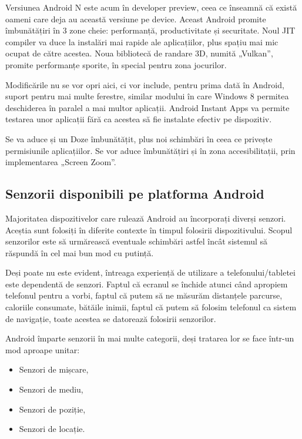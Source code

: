 \documentclass[12pt,a4paper]{article}
\begin{document}
	Versiunea Android N este acum în developer preview, ceea ce înseamnă că există oameni care deja au această versiune pe device. Aceast Android promite îmbunătățiri în 3 zone cheie: performanță, productivitate și securitate. Noul JIT compiler va duce la instalări mai rapide ale aplicațiilor, plus spațiu mai mic ocupat de către acestea. Noua bibliotecă de randare 3D, numită „Vulkan”, promite performanțe sporite, în special pentru zona jocurilor. 
	
	Modificările nu se vor opri aici, ci vor include, pentru prima dată în Android, suport pentru mai multe ferestre, similar modului în care Windows 8 permitea deschiderea în paralel a mai multor aplicații. Android Instant Apps va permite testarea unor aplicații fără ca acestea să fie instalate efectiv pe dispozitiv.	
	
	Se va aduce și un Doze îmbunătățit, plus noi schimbări în ceea ce privește permisiunile aplicațiilor. Se vor aduce îmbunătățiri și în zona accesibilitații, prin implementarea „Screen Zoom”.
	
	

\subsection{Senzorii disponibili pe platforma Android}
Majoritatea dispozitivelor care rulează Android au încorporați diverși senzori. Aceștia sunt folosiți în diferite contexte în timpul folosirii dispozitivului. Scopul senzorilor este să urmărească eventuale schimbări astfel încât sistemul să răspundă în cel mai bun mod cu putință.

	Deși poate nu este evident, întreaga experiență de utilizare a telefonului/tabletei este dependentă de senzori. Faptul că ecranul se închide atunci când apropiem telefonul pentru a vorbi, faptul că putem să ne măsurăm distanțele parcurse, caloriile consumate, bătăile inimii, faptul că putem să folosim telefonul ca sistem de navigație, toate acestea se datorează folosirii senzorilor.
	
	Android împarte senzorii în mai multe categorii, deși tratarea lor se face într-un mod aproape unitar: 
\begin{itemize}
\item Senzori de mișcare,
\item Senzori de mediu,
\item Senzori de poziție,
\item Senzori de locație.
\end{itemize}
\end{document}
